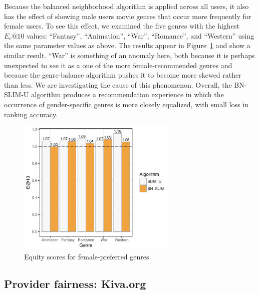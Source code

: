 Because the balanced neighborhood algorithm is applied across all users, it also has the effect of showing male users movie genres that occur more frequently for female users. To see this effect, we examined the five genres with the highest $E_c@10$ values: ``Fantasy'', ``Animation'', ``War'', ``Romance'', and ``Western'' using the same parameter values as above. The results appear in Figure~\ref{fig:inverse-equity} and show a similar result. ``War'' is something of an anomaly here, both because it is perhaps unexpected to see it as a one of the more female-recommended genres and because the genre-balance algorithm pushes it to become more skewed rather than less. We are investigating the cause of this phenomenon. Overall, the BN-SLIM-U algorithm produces a recommendation experience in which the occurrence of gender-specific genres is more closely equalized, with small loss in ranking accuracy. 

\begin{figure}[bth]
    \centering
    \includegraphics[width=3in]{imgs/bln/inverse-genres3.pdf}
    \caption{Equity scores for female-preferred genres}
    \label{fig:inverse-equity}
\end{figure}

\subsection{Provider fairness: Kiva.org}


